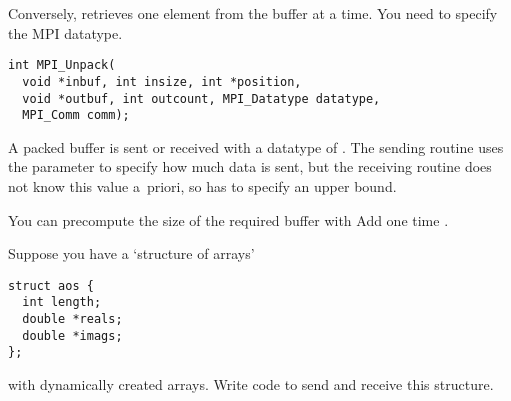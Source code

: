 Conversely,  retrieves one element
from the buffer at a time. You need to specify the MPI datatype.
\begin{lstlisting}
int MPI_Unpack(
  void *inbuf, int insize, int *position,
  void *outbuf, int outcount, MPI_Datatype datatype,
  MPI_Comm comm);
\end{lstlisting}

A packed buffer is sent or received with a datatype of
. The sending routine uses the 
parameter to specify how much data is sent, but the receiving routine
does not know this value a~priori, so has to specify an upper bound.


You can precompute the size of the required buffer with
%
%
Add one time .

\begin{exercise}
  \label{ex:packAOS}
  Suppose you have a `structure of arrays'
\begin{lstlisting}
struct aos {
  int length;
  double *reals;
  double *imags;
};
\end{lstlisting}
  with dynamically created arrays. Write code to send and receive this
  structure.
\end{exercise}
